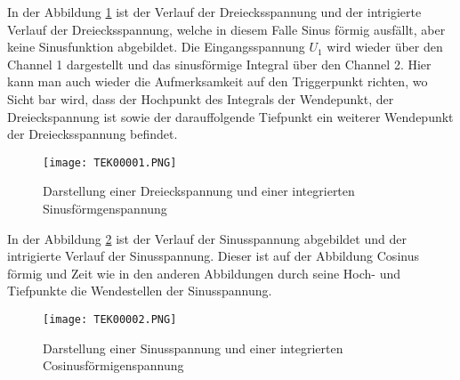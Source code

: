 \newpage
In der Abbildung \ref{fig:Versuch2/Darstellung einer Dreieckspannung und einer integrierten Sinusförmigenspannung} ist der Verlauf der Dreiecksspannung und der intrigierte Verlauf der Dreiecksspannung, welche in diesem Falle Sinus förmig ausfällt, aber keine Sinusfunktion abgebildet. Die Eingangsspannung $U_1$ wird wieder über den Channel 1 dargestellt und das sinusförmige Integral über den Channel 2. Hier kann man auch wieder die Aufmerksamkeit auf den Triggerpunkt richten, wo Sicht bar wird, dass der Hochpunkt des Integrals der Wendepunkt, der Dreieckspannung ist sowie der darauffolgende Tiefpunkt ein weiterer Wendepunkt der Dreiecksspannung befindet.    
\begin{figure}[H]
    \centering
    \texttt{[image: TEK00001.PNG]}
    \caption{Darstellung einer Dreieckspannung und einer integrierten Sinusförmgenspannung}
    \label{fig:Versuch2/Darstellung einer Dreieckspannung und einer integrierten Sinusförmigenspannung}
\end{figure}
In der Abbildung \ref{fig:Versuch2/Darstellung einer Sinusspannung und einer integrierten Cosinusförmigenspannung} ist der Verlauf der Sinusspannung abgebildet und der intrigierte Verlauf der Sinusspannung. Dieser ist auf der Abbildung Cosinus förmig und Zeit wie in den anderen Abbildungen durch seine Hoch- und Tiefpunkte die Wendestellen der Sinusspannung.      
\begin{figure}[H]
    \centering
    \texttt{[image: TEK00002.PNG]}
    \caption{Darstellung einer Sinusspannung und einer integrierten Cosinusförmigenspannung}
    \label{fig:Versuch2/Darstellung einer Sinusspannung und einer integrierten Cosinusförmigenspannung}
\end{figure}
